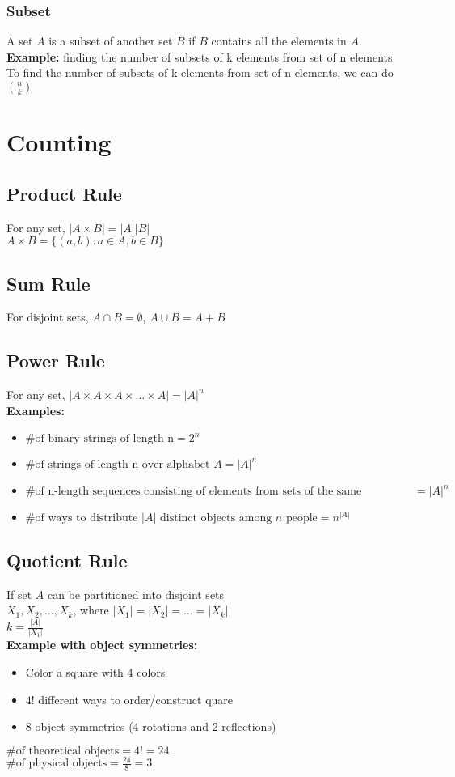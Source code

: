 \documentclass{article}
\begin{document}
\begin{spacing}{1.5}
\subsubsection{Subset}
\label{sec:subset}
A set $A$ is a subset of another set $B$ if $B$ contains all the elements in $A$.\\
\textbf{Example:} finding the number of subsets of k elements from set of n elements\\
To find the number of subsets of k elements from set of n elements, we can do $\binom{n}{k}$
\section{Counting}
\label{sec:counting}
%
\subsection{Product Rule}
For any set, $|A \times B| = |A||B|$\\
$A \times B = \{(a,b): a\in A, b\in B\}$
\label{sec:product}
%
\subsection{Sum Rule}
\label{sec:sum}
For disjoint sets, $A \cap B = \emptyset$, $A \cup B = A + B$
%
\subsection{Power Rule}
\label{sec:power}
For any set, $|A \times A \times A \times \dots \times A| = |A|^{n}$\\
\textbf{Examples:}
\begin{itemize}
    \item $\text{\# of binary strings of length n} = 2^n$
    \item $\text{\# of strings of length n over alphabet } A = |A|^n$
    \item $\text{\# of n-length sequences consisting of elements from sets of the same cardinality} = |A|^{n}$
    \item $\text{\# of ways to distribute $|A|$ distinct objects among $n$ people} = n^{|A|}$
\end{itemize}
%
\subsection{Quotient Rule}
\label{sec:quotient}
If set $A$ can be partitioned into disjoint sets\\
$X_1, X_2, \dots, X_k$, where $|X_1| = |X_2| = \dots = |X_k|$\\
$k= \frac{|A|}{|X_1|}$\\
\textbf{Example with object symmetries:}
\begin{itemize}
    \item Color a square with 4 colors
    \item $4!$ different ways to order/construct quare
    \item 8 object symmetries (4 rotations and 2 reflections)
\end{itemize}
$\text{\# of theoretical objects} = 4! = 24$\\
$\text{\# of physical objects} = \frac{24}{8} = 3$
%

\end{spacing}
\end{document}
